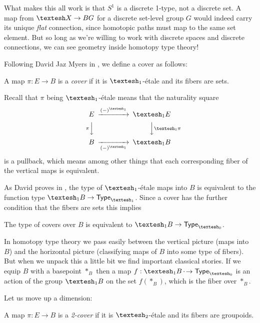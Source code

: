 \documentclass[12pt]{article}
\begin{document}

What makes this all work is that \( S^1 \) is a discrete 1-type, not a discrete set. A map from \( \shape X\to BG \) for a discrete set-level group \( G \) would indeed carry its unique \emph{flat} connection, since homotopic paths must map to the same set element. But so long as we're willing to work with discrete spaces and discrete connections, we can see geometry inside homotopy type theory!

Following David Jaz Myers in \cite{myersgood}, we define a cover as follows:

\begin{mydef}
  A map \(\pi:E\to B\) is a \emph{cover} if it is \(\shapeo\)-étale and its fibers are sets.
\end{mydef}

Recall that \(\pi\) being \(\shapeo\)-étale means that the naturality square 
\[
\begin{CD}
E @>(-)^{\shapeo}>> \shapeo E \\
@V{\pi}VV @VV{\shapeo \pi}V \\
B @>>(-)^{\shapeo}> \shapeo B
\end{CD}
\]
is a pullback, which means among other things that each corresponding fiber of the vertical maps is equivalent.

As David proves in \cite{myersgood}, the type of \(\shapeo\)-étale maps into \(B\) is equivalent to the function type \(\shapeo B \to \Typeo\). Since a cover has the further condition that the fibers are sets this implies

\begin{mylemma}
  The type of covers over \(B\) is equivalent to \(\shapeo B \to \Type_{\shapez}\).
\end{mylemma}

In homotopy type theory we pass easily between the vertical picture (maps into \(B\)) and the horizontal picture (classifying maps of \(B\) into some type of fibers). But when we unpack this a little bit we find important classical stories. If we equip \(B\) with a basepoint \(*_B\) then a map \(f:\shapeo B \dotto \Type_{\shapez}\) is an action of the group \(\shapeo B\) on the set \(f(*_B)\), which is the fiber over \(*_B\).

Let us move up a dimension:

\begin{mydef}
  A map \(\pi:E\to B\) is a \emph{2-cover} if it is \(\shapet\)-étale and its fibers are groupoids.
\end{mydef}
\end{document}
